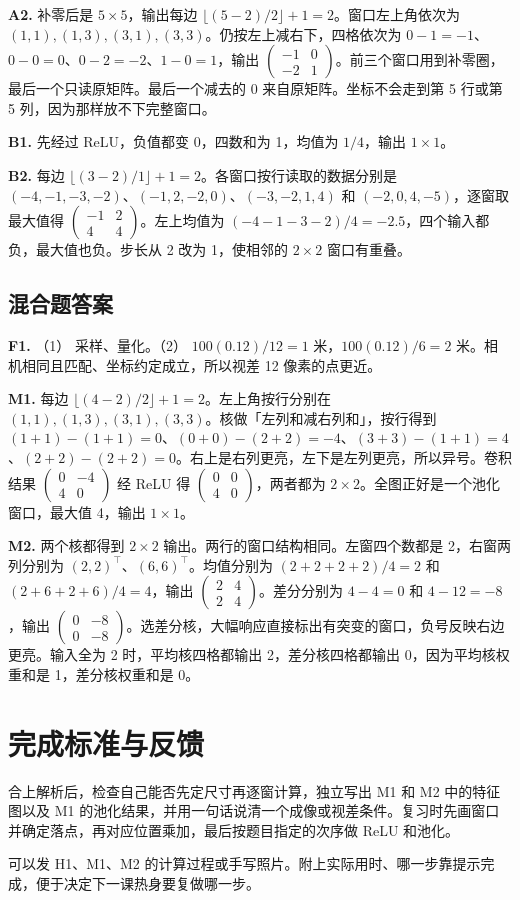 \documentclass[UTF8,a4paper,11pt]{ctexart}
\begin{document}
\textbf{A2.} 补零后是 $5\times5$，输出每边 $\lfloor(5-2)/2\rfloor+1=2$。窗口左上角依次为 $(1,1),(1,3),(3,1),(3,3)$。仍按左上减右下，四格依次为 $0-1=-1$、$0-0=0$、$0-2=-2$、$1-0=1$，输出 $\begin{pmatrix}-1&0\\-2&1\end{pmatrix}$。前三个窗口用到补零圈，最后一个只读原矩阵。最后一个减去的 0 来自原矩阵。坐标不会走到第 5 行或第 5 列，因为那样放不下完整窗口。

\textbf{B1.} 先经过 ReLU，负值都变 0，四数和为 1，均值为 $1/4$，输出 $1\times1$。

\textbf{B2.} 每边 $\lfloor(3-2)/1\rfloor+1=2$。各窗口按行读取的数据分别是 $( -4,-1,-3,-2)$、$(-1,2,-2,0)$、$(-3,-2,1,4)$ 和 $(-2,0,4,-5)$，逐窗取最大值得 $\begin{pmatrix}-1&2\\4&4\end{pmatrix}$。左上均值为 $(-4-1-3-2)/4=-2.5$，四个输入都负，最大值也负。步长从 2 改为 1，使相邻的 $2\times2$ 窗口有重叠。

\clearpage
\subsection{混合题答案}
\textbf{F1.} （1） 采样、量化。（2） $100(0.12)/12=1$ 米，$100(0.12)/6=2$ 米。相机相同且匹配、坐标约定成立，所以视差 12 像素的点更近。

\textbf{M1.} 每边 $\lfloor(4-2)/2\rfloor+1=2$。左上角按行分别在 $(1,1),(1,3),(3,1),(3,3)$。核做「左列和减右列和」，按行得到 $(1+1)-(1+1)=0$、$(0+0)-(2+2)=-4$、$(3+3)-(1+1)=4$、$(2+2)-(2+2)=0$。右上是右列更亮，左下是左列更亮，所以异号。卷积结果 $\begin{pmatrix}0&-4\\4&0\end{pmatrix}$ 经 ReLU 得 $\begin{pmatrix}0&0\\4&0\end{pmatrix}$，两者都为 $2\times2$。全图正好是一个池化窗口，最大值 4，输出 $1\times1$。

\textbf{M2.} 两个核都得到 $2\times2$ 输出。两行的窗口结构相同。左窗四个数都是 2，右窗两列分别为 $(2,2)^\top$、$(6,6)^\top$。均值分别为 $(2+2+2+2)/4=2$ 和 $(2+6+2+6)/4=4$，输出 $\begin{pmatrix}2&4\\2&4\end{pmatrix}$。差分分别为 $4-4=0$ 和 $4-12=-8$，输出 $\begin{pmatrix}0&-8\\0&-8\end{pmatrix}$。选差分核，大幅响应直接标出有突变的窗口，负号反映右边更亮。输入全为 2 时，平均核四格都输出 2，差分核四格都输出 0，因为平均核权重和是 1，差分核权重和是 0。

\section{完成标准与反馈}
合上解析后，检查自己能否先定尺寸再逐窗计算，独立写出 M1 和 M2 中的特征图以及 M1 的池化结果，并用一句话说清一个成像或视差条件。复习时先画窗口并确定落点，再对应位置乘加，最后按题目指定的次序做 ReLU 和池化。

可以发 H1、M1、M2 的计算过程或手写照片。附上实际用时、哪一步靠提示完成，便于决定下一课热身要复做哪一步。
\end{document}
